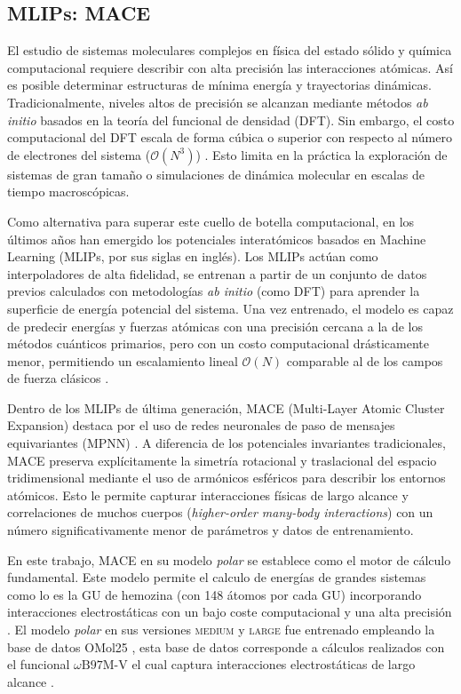 \documentclass[12pt]{article}
\begin{document}
\subsection{MLIPs: MACE}
\label{subsec:metodo_mace}

El estudio de sistemas moleculares complejos en física del estado sólido y química computacional requiere describir con alta precisión las interacciones atómicas. Así es posible determinar estructuras de mínima energía y trayectorias dinámicas. Tradicionalmente, niveles altos de precisión se alcanzan mediante métodos \textit{ab initio} basados en la teoría del funcional de densidad (DFT). Sin embargo, el costo computacional del DFT escala de forma cúbica o superior con respecto al número de electrones del sistema ($\mathcal{O}(N^3)$) \cite{capelle2006birds}. Esto limita en la práctica la exploración de sistemas de gran tamaño o simulaciones de dinámica molecular en escalas de tiempo macroscópicas.

Como alternativa para superar este cuello de botella computacional, en los últimos años han emergido los potenciales interatómicos basados en Machine Learning (MLIPs, por sus siglas en inglés). Los MLIPs actúan como interpoladores de alta fidelidad, se entrenan a partir de un conjunto de datos previos calculados con metodologías \textit{ab initio} (como DFT) para aprender la superficie de energía potencial del sistema. Una vez entrenado, el modelo es capaz de predecir energías y fuerzas atómicas con una precisión cercana a la de los métodos cuánticos primarios, pero con un costo computacional drásticamente menor, permitiendo un escalamiento lineal $\mathcal{O}(N)$ comparable al de los campos de fuerza clásicos \cite{batatia2023mace}.

Dentro de los MLIPs de última generación, MACE (Multi-Layer Atomic Cluster Expansion) destaca por el uso de redes neuronales de paso de mensajes equivariantes (MPNN) \cite{batatia2023mace, batatia2026macepolar}. A diferencia de los potenciales invariantes tradicionales, MACE preserva explícitamente la simetría rotacional y traslacional del espacio tridimensional mediante el uso de armónicos esféricos para describir los entornos atómicos. Esto le permite capturar interacciones físicas de largo alcance y correlaciones de muchos cuerpos (\textit{higher-order many-body interactions}) con un número significativamente menor de parámetros y datos de entrenamiento.

En este trabajo, MACE en su modelo \textit{polar} se establece como el motor de cálculo fundamental. Este modelo permite el calculo de energías de grandes sistemas como lo es la GU de hemozina (con 148 átomos por cada GU) incorporando interacciones electrostáticas con un bajo coste computacional y una alta precisión \cite{batatia2026macepolar}. El modelo \textit{polar} en sus versiones \textsc{medium} y \textsc{large} fue entrenado empleando la base de datos OMol25 \cite{ batatia2026macepolar,omol2025}, esta base de datos corresponde a cálculos realizados con el funcional $\omega\text{B97M-V}$ el cual captura interacciones electrostáticas de largo alcance \cite{mardirossian2016wb97m}. 
\end{document}
